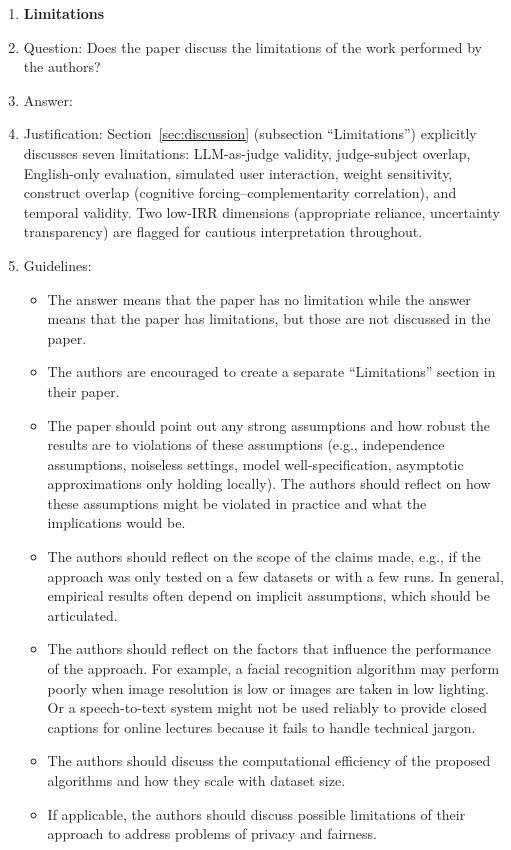 \begin{enumerate}
\item {\bf Limitations}
    \item[] Question: Does the paper discuss the limitations of the work performed by the authors?
    \item[] Answer: \answerYes{}
    \item[] Justification: Section~\ref{sec:discussion} (subsection ``Limitations'') explicitly discusses seven limitations: LLM-as-judge validity, judge-subject overlap, English-only evaluation, simulated user interaction, weight sensitivity, construct overlap (cognitive forcing--complementarity correlation), and temporal validity. Two low-IRR dimensions (appropriate reliance, uncertainty transparency) are flagged for cautious interpretation throughout.
    \item[] Guidelines:
    \begin{itemize}
        \item The answer \answerNA{} means that the paper has no limitation while the answer \answerNo{} means that the paper has limitations, but those are not discussed in the paper.
        \item The authors are encouraged to create a separate ``Limitations'' section in their paper.
        \item The paper should point out any strong assumptions and how robust the results are to violations of these assumptions (e.g., independence assumptions, noiseless settings, model well-specification, asymptotic approximations only holding locally). The authors should reflect on how these assumptions might be violated in practice and what the implications would be.
        \item The authors should reflect on the scope of the claims made, e.g., if the approach was only tested on a few datasets or with a few runs. In general, empirical results often depend on implicit assumptions, which should be articulated.
        \item The authors should reflect on the factors that influence the performance of the approach. For example, a facial recognition algorithm may perform poorly when image resolution is low or images are taken in low lighting. Or a speech-to-text system might not be used reliably to provide closed captions for online lectures because it fails to handle technical jargon.
        \item The authors should discuss the computational efficiency of the proposed algorithms and how they scale with dataset size.
        \item If applicable, the authors should discuss possible limitations of their approach to address problems of privacy and fairness.

\end{itemize}
\end{enumerate}

